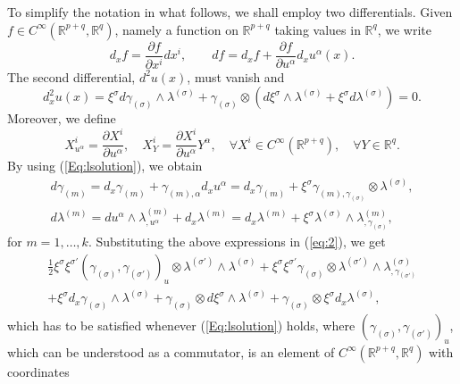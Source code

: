 \documentclass{birkjour}
\theoremstyle{definition}
\theoremstyle{remark}
\numberwithin{equation}{section}
\numberwithin{equation}{section}
\numberwithin{thm}{section}
\numberwithin{equation}{section}
\numberwithin{thm}{section}
\begin{document}
To simplify the notation in what follows, we shall employ two differentials. Given $f\in C^\infty(\mathbb{R}^{p+q},\mathbb{R}^q)$, namely a function on $\mathbb{R}^{p+q}$ taking values in $\mathbb{R}^q$, we write
$$
d_xf= \frac{\partial f}{\partial x^i}dx^i,\qquad df=d_xf+ \frac{\partial f}{\partial u^\alpha}d_xu^\alpha(x).
$$
The second differential, $d^2u(x)$, must vanish and
\begin{equation}
	\label{eq:2}  d_x^2u(x)= \xi^{\sigma} d\gamma_{(\sigma)} \wedge \lambda^{(\sigma)} +\gamma_{(\sigma)} \otimes (d\xi^{\sigma} \wedge \lambda^{(\sigma)}+\xi^\sigma d\lambda^{(\sigma)} )=0.
\end{equation}
Moreover, we define
$$
X^i_{u^\alpha}=\frac{\partial X^i}{\partial u^\alpha},\quad X^i_Y=\frac{\partial X^i}{\partial u^\alpha}Y^\alpha,\quad \forall X^i\in C^\infty(\mathbb{R}^{p+q}),\quad \forall Y\in \mathbb{R}^q.
$$
By using (\ref{Eq:lsolution}), we obtain
$$
\begin{gathered}
	d\gamma_{(m)}=d_x\gamma_{(m)}+\gamma_{(m),\alpha}d_xu^\alpha=d_x\gamma_{(m)}+\xi^\sigma\gamma_{(m),\gamma_{(\sigma)}}\otimes \lambda^{(\sigma)},\\
	d\lambda^{(m)}=du^\alpha\wedge \lambda^{(m)}_{,u^\alpha}+d_x\lambda^{(m)}=d_x\lambda^{(m)}+\xi^\sigma\lambda^{(\sigma)}\wedge \lambda^{(m)}_{,\gamma_{(\sigma)}},
\end{gathered}
$$
for $m=1,\ldots,k$. Substituting the above expressions in (\ref{eq:2}), we get
\begin{multline}\label{Eq:Exp}
	\frac 12\xi^{\sigma}\xi^{\sigma'}(\gamma_{(\sigma)},\gamma_{(\sigma')})_u\otimes \lambda^{(\sigma')}\wedge\lambda^{(\sigma)}+\xi^\sigma\xi^{\sigma'}\gamma_{(\sigma)}\otimes \lambda^{(\sigma')}\wedge \lambda_{,\gamma_{(\sigma')}}^{(\sigma)}
	\\+\xi^\sigma d_x\gamma_{(\sigma )}\wedge\lambda^{(\sigma )}+\gamma_{(\sigma)}\otimes d\xi^\sigma\wedge\lambda^{(\sigma)}+\gamma_{(\sigma)}\otimes \xi^\sigma d_x\lambda^{(\sigma)},
\end{multline}
which has to be satisfied whenever (\ref{Eq:lsolution}) holds, 
where
$(\gamma_{(\sigma)},\gamma_{(\sigma')})_u$, which can be understood as a commutator, is an element of $C^\infty(\mathbb{R}^{p+q},\mathbb{R}^q)$ with coordinates
\end{document}
